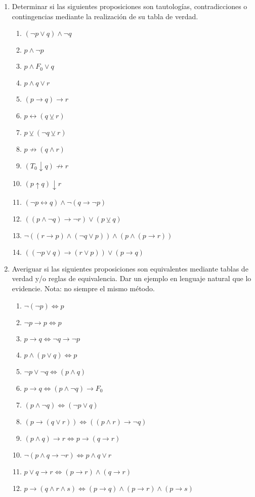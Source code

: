 \documentclass[a4paper]{article}
\newcommand{\Item}{\item[\stepcounter{enumii}$\blacktriangleright$\textbf{(\alph{enumii})}]} %
\newcommand{\exercise}{\item}
\newcommand{\then}{\to}
\newcommand{\eq}{\leftrightarrow}
\newcommand{\xor}{\veebar}
\newcommand{\nor}{\downarrow}
\newcommand{\nimply}{\nrightarrow}
\newcommand{\nand}{\uparrow}
\newcommand{\Eq}{\Leftrightarrow}
\begin{document}
\begin{enumerate}
\begin{multicols}{2}
	\end{multicols}
	\exercise Determinar si las siguientes proposiciones son tautologías, contradicciones o contingencias mediante la realización de su tabla de verdad. 
	\begin{multicols}{2}
	\begin{enumerate} [label=(\alph*)]
		\Item $(\neg p \lor  q) \land  \neg q$
		\item $p \land  \neg p$
		\Item $p \land  F_0 \lor  q$
		\item $p \land  q \lor  r$
		\item $(p \then  q) \then  r$
		\Item $p \eq (q \xor  r)$
		\item $p \xor  (\neg q \xor  r)$
		\item $p \nimply (q \land  r)$
		\item $(T_0 \nor q) \nimply r$
		\Item $(p \nand q) \nor r$
		\item $(\neg p \eq q) \land \neg (q \then \neg p)$
		\item $((p \land \neg q) \then \neg r) \lor (p \xor q)$
		\Item $\neg ((r \then p) \land (\neg q \lor p)) \land ( p \land (p \then r))$
		\item $((\neg p \lor q) \then (r \lor p)) \lor (p \then q)$
	\end{enumerate}
	\end{multicols}
	\exercise Averiguar si las siguientes proposiciones son equivalentes mediante tablas de verdad y/o reglas de equivalencia.  Dar un ejemplo en lenguaje natural que lo evidencie. Nota: no siempre el mismo método.
	\begin{multicols}{2}
	\begin{enumerate} [label=(\alph*)]
		\item $\neg (\neg p) \Eq  p$
		\item $\neg p\then p \Eq p$
		\item $p\then q \Eq \neg q\then \neg p$
		\Item $p \land  (p \lor  q) \Eq  p$
		\item $\neg p\lor \neg q \Eq (p\land q)$
		\Item $p\then q	\Eq (p \land  \neg q)\then F_0$
		\item $(p \land \neg q) \Eq (\neg p \lor q)$
		\Item $(p \then (q \lor r)) \Eq ((p \land r) \then \neg q)$
		\Item $(p\land q)\then r \Eq p\then (q\then r) $
		\item $\neg (p\land q\then \neg r)	\Eq 	p\land q\lor r$
		\Item $p\lor q \then  r	\Eq (p\then r) \land  (q\then r)$
		\item $p\then (q\land r\land s) \Eq (p\then q)\land (p\then r)\land (p\then s)$

\end{enumerate}
\end{multicols}
\end{enumerate}
\end{document}
